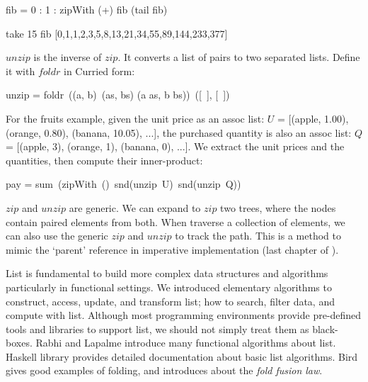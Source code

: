 \documentclass[b5paper]{article}
\begin{document}
\begin{Haskell}
fib = 0 : 1 : zipWith (+) fib (tail fib)

take 15 fib
[0,1,1,2,3,5,8,13,21,34,55,89,144,233,377]
\end{Haskell}

$unzip$ is the inverse of $zip$. It converts a list of pairs to two separated lists. Define it with $foldr$ in Curried form:

\be
unzip = foldr\ ((a, b)\ (as, bs) \mapsto (a \cons as, b \cons bs))\ ([\ ], [\ ])
\ee

For the fruits example, given the unit price as an assoc list: $U$ = [(apple, 1.00), (orange, 0.80), (banana, 10.05), ...], the purchased quantity is also an assoc list: $Q$ = [(apple, 3), (orange, 1), (banana, 0), ...]. We extract the unit prices and the quantities, then compute their inner-product:

\be
pay = sum\ (zipWith\ (\cdot)\ snd(unzip\ U)\ snd(unzip\ Q))
\ee

$zip$ and $unzip$ are generic. We can expand to $zip$ two trees, where the nodes contain paired elements from both. When traverse a collection of elements, we can also use the generic $zip$ and $unzip$ to track the path. This is a method to mimic the `parent' reference in imperative implementation (last chapter of \cite{learn-haskell}).

List is fundamental to build more complex data structures and algorithms particularly in functional settings. We introduced elementary algorithms to construct, access, update, and transform list; how to search, filter data, and compute with list. Although most programming environments provide pre-defined tools and libraries to support list, we should not simply treat them as black-boxes. Rabhi and Lapalme introduce many functional algorithms about list\cite{algo-fp}. Haskell library provides detailed documentation about basic list algorithms. Bird gives good examples of folding\cite{fp-pearls}, and introduces about the {\em fold fusion law}.
\end{document}

